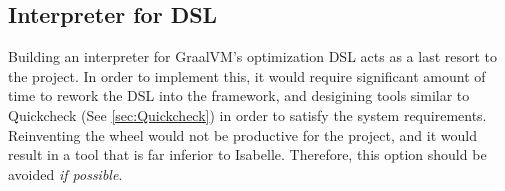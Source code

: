 \subsection{Interpreter for DSL}
\label{sec:DSLInterpreter}

Building an interpreter for GraalVM's optimization DSL acts as a last resort to the project. In order to implement this, it would require significant 
amount of time to rework the DSL into the framework, and desigining tools similar to Quickcheck (See \ref{sec:Quickcheck}) in order to satisfy the 
system requirements. Reinventing the wheel would not be productive for the project, and it would result in a tool that is far inferior to Isabelle.
Therefore, this option should be avoided \emph{if possible}.